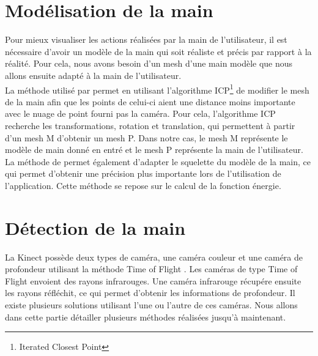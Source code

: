 \section{Modélisation de la main}
Pour mieux visualiser les actions réalisées par la main de l'utilisateur, il est nécessaire d'avoir
un modèle de la main qui soit réaliste et précis par rapport à la réalité. Pour cela, nous avons besoin d'un
mesh d'une main modèle que nous allons ensuite adapté à la main de l'utilisateur.\\

La méthode utilisé par \cite{export:217428} permet en utilisant l'algorithme
ICP\footnote{Iterated Closest Point} \cite{121791} de modifier le mesh de la main afin
que les points de celui-ci aient une distance moins importante avec le nuage de point fourni pas la 
caméra. Pour cela, l'algorithme ICP recherche les transformations, rotation et translation, qui permettent 
à partir d'un mesh M d'obtenir un mesh P. Dans notre cas, le mesh M représente le modèle de main donné en entré
et le mesh P représente la main de l'utilisateur.\\ 

La méthode de \cite{export:217428} permet également d'adapter le squelette du modèle de la 
main, ce qui permet d'obtenir une précision plus importante lors de l'utilisation de l'application.
Cette méthode se repose sur le calcul de la fonction énergie.

\section{Détection de la main}

La Kinect possède deux types de caméra, une caméra couleur et une caméra de profondeur utilisant la méthode 
\og Time of Flight \fg. Les caméras de type \og Time of Flight \fg envoient des rayons infrarouges. Une caméra infrarouge
récupére ensuite les rayons réfléchit, ce qui permet d'obtenir les informations de profondeur. 
Il existe plusieurs solutions utilisant l'une ou l'autre de ces caméras. Nous allons
dans cette partie détailler plusieurs méthodes réalisées jusqu'à maintenant.

